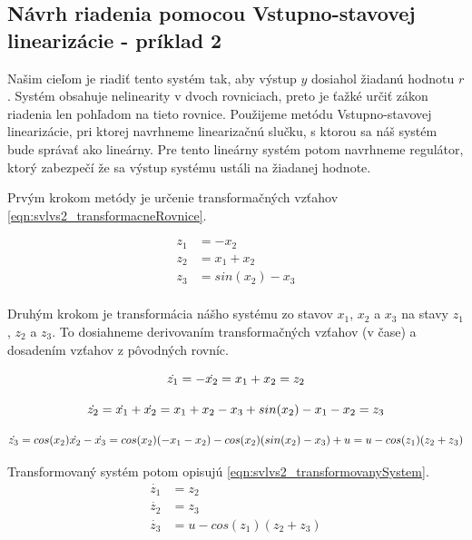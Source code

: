 \documentclass[../main.tex]{subfiles}
\begin{document}
\newpage
\subsection*{Návrh riadenia pomocou Vstupno-stavovej linearizácie - príklad 2}

	Našim cieľom je riadiť tento systém tak, aby výstup $y$ dosiahol žiadanú hodnotu $r$. Systém obsahuje nelinearity v dvoch rovniciach, preto je ťažké určiť zákon riadenia len pohľadom na tieto rovnice. Použijeme metódu Vstupno-stavovej linearizácie, pri ktorej navrhneme linearizačnú slučku, s ktorou sa náš systém bude správať ako lineárny. Pre tento lineárny systém potom navrhneme regulátor, ktorý zabezpečí že sa výstup systému ustáli na žiadanej hodnote.

Prvým krokom metódy je určenie transformačných vzťahov \cref{eqn:svlvs2_transformacneRovnice}.

	\begin{equation}
		\begin{aligned}
		z_1 &= -x_2 													\\
		z_2 &= x_1 + x_2												\\
		z_3 &= sin(x_2) - x_3 											\\
		\end{aligned}
		\label{eqn:svlvs2_transformacneRovnice}
	\end{equation}

Druhým krokom je transformácia nášho systému zo stavov $x_1$, $x_2$ a $x_3$ na stavy $z_1$, $z_2$ a $z_3$. To dosiahneme derivovaním transformačných vzťahov (v čase) a dosadením vzťahov z pôvodných rovníc.

	\begin{equation}
		\dot{z_1} = -\dot{x_2} = x_1 + x_2 =  z_2 								\\
	\end{equation}

	\begin{equation}
		\dot{z_2} = \dot{x_1} + \dot{x_2} = x_1 + x_2 - x_3 + sin(x_2) - x_1 - x_2  = z_3 	\\
	\end{equation}

	\begin{equation}
		\dot{z_3} = cos(x_2)\dot{x_2} - \dot{x_3} = cos(x_2)(-x_1 -x_2) -cos(x_2)(sin(x_2) - x_3) + u = u - cos(z_1)(z_2+z_3) 	\\
	\end{equation}
	
	Transformovaný systém potom opisujú  \cref{eqn:svlvs2_transformovanySystem}.
	\begin{equation}
		\begin{aligned}
		\dot{z_1} &=  z_2												\\
		\dot{z_2} &=  z_3												\\
		\dot{z_3} &=  u - cos(z_1)(z_2+z_3)									\\
		\end{aligned}
		\label{eqn:svlvs2_transformovanySystem}
	\end{equation}
\end{document}
